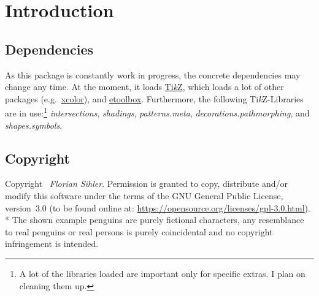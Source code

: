 \documentclass[parskip=half,english,numbers=noenddot,footnotes=nomultiple,oneside]{scrartcl}
\def\TikZ{Ti\textit{k}Z}
\begin{document}
\begin{center}
{}
\end{center}
\vfill\null

\clearpage
\tableofcontents
\clearpage
\section{Introduction}
\subsection{Dependencies}

As this package is constantly work in progress, the concrete dependencies may change any time.
At the moment, it loads \href{https://www.ctan.org/pkg/pgf}{\TikZ}, which loads a lot of other packages (e.g.\ \href{https://www.ctan.org/pkg/xcolor}{xcolor}), and \href{https://www.ctan.org/pkg/etoolbox}{etoolbox}.
Furthermore, the following \TikZ-Libraries are in use:\footnote{A lot of the libraries loaded are important only for specific extras. I plan on cleaning them up.} \textit{intersections}, \textit{shadings}, \textit{patterns.meta}, \textit{decorations.pathmorphing}, and \textit{shapes.symbols}.

\subsection{Copyright}

Copyright \textcopyright\ \textit{Florian Sihler}. Permission is granted to copy, distribute and\slash or modify this software under the terms of the GNU General Public License, version~3.0 (to be found online at: \url{https://opensource.org/licenses/gpl-3.0.html}).\\*
The shown example penguins are purely fictional characters, any resemblance to real penguins or real persons is purely coincidental and no copyright infringement is intended.
\end{document}
